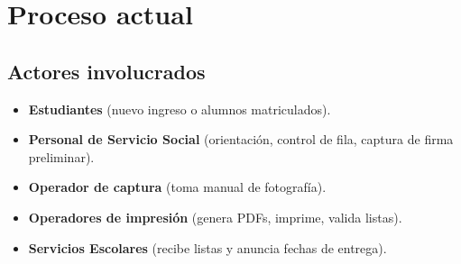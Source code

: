 \documentclass[12pt,a4paper]{article}
\begin{document}
\section{Proceso actual}

\subsection{Actores involucrados}
\begin{itemize}
  \item \textbf{Estudiantes} (nuevo ingreso o alumnos matriculados).
  \item \textbf{Personal de Servicio Social} (orientación, control de fila, captura de firma preliminar).
  \item \textbf{Operador de captura} (toma manual de fotografía).
  \item \textbf{Operadores de impresión} (genera PDFs, imprime, valida listas).
  \item \textbf{Servicios Escolares} (recibe listas y anuncia fechas de entrega).
\end{itemize}
\end{document}
